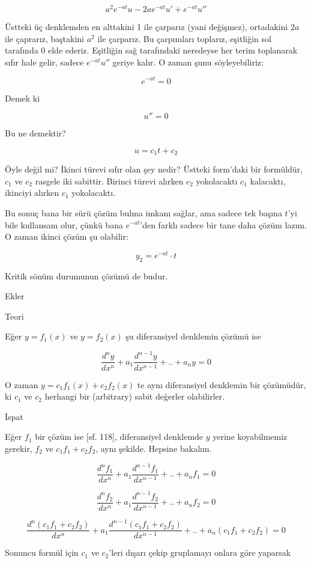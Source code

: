 \documentclass[12pt,fleqn]{article}\usepackage{../../common}
\begin{document}
$$ a^2e^{-at}u - 2ae^{-at}u' + e^{-at}u'' $$

Üstteki üç denklemden en alttakini 1 ile çarparız (yani değişmez), ortadakini
$2a$ ile çaprarız, baştakini $a^2$ ile çarparız. Bu çarpımları toplarız,
eşitliğin sol tarafında 0 elde ederiz. Eşitliğin sağ tarafındaki neredeyse her
terim toplanarak sıfır hale gelir, sadece $e^{-at}u''$ geriye kalır. O zaman
şunu söyleyebiliriz:

$$ e^{-at} = 0 $$

Demek ki 

$$ u'' = 0 $$

Bu ne demektir?

$$ u = c_1t + c_2 $$

Öyle değil mi? İkinci türevi sıfır olan şey nedir? Üstteki form'daki bir
formüldür, $c_1$ ve $c_2$ rasgele iki sabittir. Birinci türevi alırken $c_2$
yokolacaktı $c_1$ kalacaktı, ikinciyi alırken $c_1$ yokolacaktı.

Bu sonuç bana bir sürü çözüm bulma imkanı sağlar, ama sadece tek başına $t$'yi
bile kullansam olur, çünkü bana $e^{-at}$'den farklı sadece bir tane daha çözüm
lazım. O zaman ikinci çözüm şu olabilir:

$$ y_2 = e^{-at} \cdot t $$

Kritik sönüm durumunun çözümü de budur. 

Ekler

Teori

Eğer $y=f_1(x)$ ve $y=f_2(x)$ şu diferansiyel denklemin çözümü ise

$$ \frac{d^ny}{dx^n} + a_1 \frac{d^{n-1}y}{dx^{n-1}} + .. + a_n y = 0$$


O zaman $y=c_1f_1(x) + c_2f_2(x)$ te aynı diferansiyel denklemin bir çözümüdür,
ki $c_1$ ve $c_2$ herhangi bir (arbitrary) sabit değerler olabilirler.

İspat

Eğer $f_1$ bir çözüm ise [sf. 118], diferansiyel denklemde $y$ yerine
koyabilmemiz gerekir, $f_2$ ve $c_1f_1 + c_2f_2$, aynı şekilde. Hepsine bakalım.

$$ \frac{d^nf_1}{dx^n} + a_1 \frac{d^{n-1}f_1}{dx^{n-1}} + .. + a_n f_1 = 0$$

$$ \frac{d^nf_2}{dx^n} + a_1 \frac{d^{n-1}f_2}{dx^{n-1}} + .. + a_n f_2 = 0$$

$$ \frac{d^n(c_1f_1 + c_2f_2)}{dx^n} + 
a_1 \frac{d^{n-1}(c_1f_1 + c_2f_2)}{dx^{n-1}} + .. + 
a_n (c_1f_1 + c_2f_2) = 0
$$

Sonuncu formül için $c_1$ ve $c_2$'leri dışarı çekip gruplamayı onlara göre
yaparsak
\end{document}
